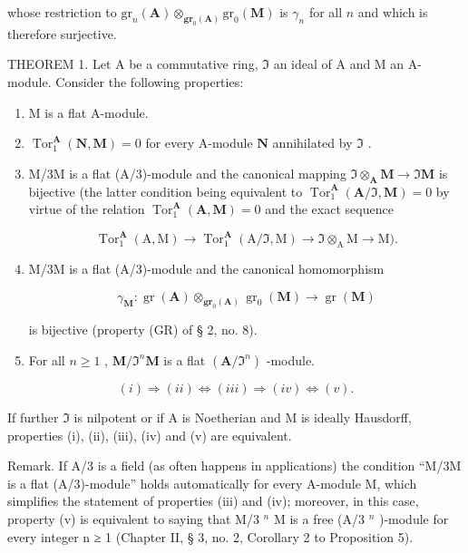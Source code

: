 whose restriction to \(\mathrm{gr}_n(\mathbf{A})\otimes_{\mathbf{gr}_0(\mathbf{A})}\mathrm{gr}_0(\mathbf{M})\) is \(\gamma_{n}\) for all \(n\) and which is therefore surjective.

THEOREM 1. Let A be a commutative ring, \(\Im\) an ideal of A and M an A-module. Consider the following properties:

\begin{enumerate}
\def\labelenumi{(\roman{enumi})}
\item
  M is a flat A-module.
\item
  \(\operatorname{Tor}_1^{\mathbf{A}}(\mathbf{N},\mathbf{M}) = 0\) for every A-module \(\mathbf{N}\) annihilated by \(\Im\) .
\item
  M/3M is a flat (A/3)-module and the canonical mapping \(\Im \otimes_{\mathbf{A}} \mathbf{M} \to \Im \mathbf{M}\) is bijective (the latter condition being equivalent to \(\operatorname{Tor}_{1}^{\mathbf{A}}(\mathbf{A}/\Im, \mathbf{M}) = 0\) by virtue of the relation \(\operatorname{Tor}_{1}^{\mathbf{A}}(\mathbf{A}, \mathbf{M}) = 0\) and the exact sequence

\[
\operatorname{Tor} _ {1} ^ {\mathbf {A}} (\mathrm{A}, \mathrm{M}) \rightarrow \operatorname{Tor} _ {1} ^ {\mathbf {A}} (\mathrm{A} / \Im , \mathrm{M}) \rightarrow \Im \otimes_ {\mathrm{A}} \mathrm{M} \rightarrow \mathrm{M}).
\]

\item
  M/3M is a flat (A/3)-module and the canonical homomorphism

\[
\gamma_ {\mathbf {M}} \colon \operatorname{gr} (\mathbf {A}) \otimes_ {\mathbf {g r} _ {0} (\mathbf {A})} \operatorname{gr} _ {0} (\mathbf {M}) \rightarrow \operatorname{gr} (\mathbf {M})
\]

is bijective (property (GR) of § 2, no. 8).

\item
  For all \(n \geqslant 1\) , \(\mathbf{M} / \Im^n\mathbf{M}\) is a flat \((\mathbf{A} / \Im^n)\) -module.
\end{enumerate}

\[
(i) \Rightarrow (i i) \Leftrightarrow (i i i) \Rightarrow (i v) \Leftrightarrow (v).
\]

If further \(\mathfrak{I}\) is nilpotent or if A is Noetherian and M is ideally Hausdorff, properties (i), (ii), (iii), (iv) and (v) are equivalent.

Remark. If A/3 is a field (as often happens in applications) the condition ``M/3M is a flat (A/3)-module'' holds automatically for every A-module M, which simplifies the statement of properties (iii) and (iv); moreover, in this case, property (v) is equivalent to saying that M/3 \(^{n}\) M is a free (A/3 \(^{n}\) )-module for every integer n ≥ 1 (Chapter II, § 3, no. 2, Corollary 2 to Proposition 5).

